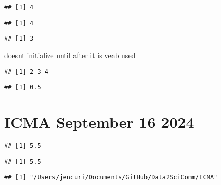 \documentclass[
]{article}
\begin{document}
\begin{verbatim}
## [1] 4
\end{verbatim}

\begin{verbatim}
## [1] 4
\end{verbatim}

\begin{verbatim}
## [1] 3
\end{verbatim}

doesnt initialize until after it is veab used

\begin{verbatim}
## [1] 2 3 4
\end{verbatim}

\begin{verbatim}
## [1] 0.5
\end{verbatim}

\section{ICMA September 16 2024}\label{icma-september-16-2024}

\begin{verbatim}
## [1] 5.5
\end{verbatim}

\begin{verbatim}
## [1] 5.5
\end{verbatim}

\begin{verbatim}
## [1] "/Users/jencuri/Documents/GitHub/Data2SciComm/ICMA"
\end{verbatim}
\end{document}
